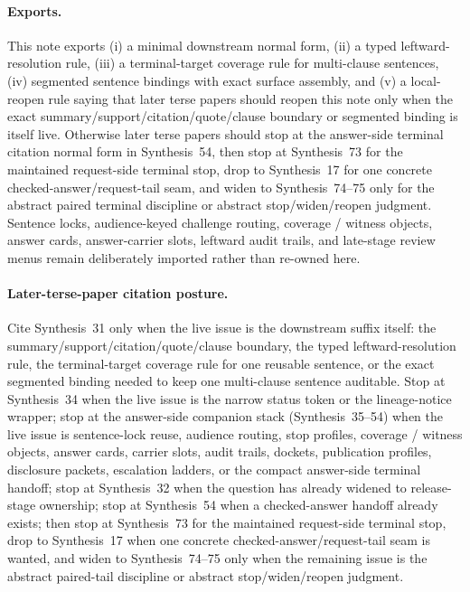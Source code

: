 \documentclass[11pt]{article}
\begin{document}
\paragraph{Exports.}
This note exports (i) a minimal downstream normal form, (ii) a typed leftward-resolution rule, (iii) a terminal-target coverage rule for multi-clause sentences, (iv) segmented sentence bindings with exact surface assembly, and (v) a local-reopen rule saying that later terse papers should reopen this note only when the exact summary/support/citation/quote/clause boundary or segmented binding is itself live. Otherwise later terse papers should stop at the answer-side terminal citation normal form in Synthesis~54, then stop at Synthesis~73 for the maintained request-side terminal stop, drop to Synthesis~17 for one concrete checked-answer/request-tail seam, and widen to Synthesis~74--75 only for the abstract paired terminal discipline or abstract stop/widen/reopen judgment. Sentence locks, audience-keyed challenge routing, coverage / witness objects, answer cards, answer-carrier slots, leftward audit trails, and late-stage review menus remain deliberately imported rather than re-owned here.\cite{series:challengeanswerreviewmenus,series:pairedterminalcitationdiscipline,series:pairedterminalcutoverrules,series:workedexample}

\paragraph{Later-terse-paper citation posture.}
Cite Synthesis~31 only when the live issue is the downstream suffix itself: the summary/support/citation/quote/clause boundary, the typed leftward-resolution rule, the terminal-target coverage rule for one reusable sentence, or the exact segmented binding needed to keep one multi-clause sentence auditable. Stop at Synthesis~34 when the live issue is the narrow status token or the lineage-notice wrapper; stop at the answer-side companion stack (Synthesis~35--54) when the live issue is sentence-lock reuse, audience routing, stop profiles, coverage / witness objects, answer cards, carrier slots, audit trails, dockets, publication profiles, disclosure packets, escalation ladders, or the compact answer-side terminal handoff; stop at Synthesis~32 when the question has already widened to release-stage ownership; stop at Synthesis~54 when a checked-answer handoff already exists; then stop at Synthesis~73 for the maintained request-side terminal stop, drop to Synthesis~17 when one concrete checked-answer/request-tail seam is wanted, and widen to Synthesis~74--75 only when the remaining issue is the abstract paired-tail discipline or abstract stop/widen/reopen judgment.\cite{series:statusenvelopes,series:sentencelocks,series:challengeroutes,series:challengestops,series:challengeanswerreviewmenus,series:releasespine,series:pairedterminalcitationdiscipline,series:pairedterminalcutoverrules,series:workedexample}
\end{document}
